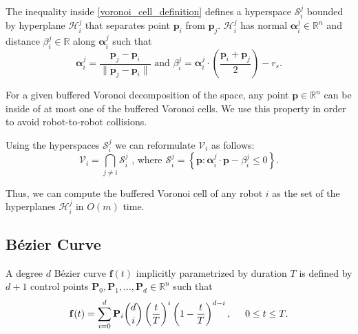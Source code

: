 \documentclass{svproc}
\newcommand{\vp}{\mathbf{p}}
\newcommand{\valpha}{\mathbf{\alpha}}
\newcommand{\vP}{\mathbf{P}}
\newcommand{\vf}{\mathbf{f}}
\newcommand{\cV}{\mathcal{V}}
\newcommand{\cS}{\mathcal{S}}
\newcommand{\cH}{\mathcal{H}}
\newcommand{\R}{\mathbb{R}} %
\begin{document}
The inequality inside \eqref{voronoi_cell_definition} defines a hyperspace $\cS_i^j$ bounded by hyperplane $\cH_i^j$ that separates point $\vp_i$ from $\vp_j$. $\cH_i^j$ has normal $\valpha_i^j \in \R^n$ and distance $\beta_i^j\in \R$ along $\valpha_i^j$ such that
\begin{equation}
    \valpha_i^j = \frac{\vp_j - \vp_i}{\|\vp_j-\vp_i\|} \text{ and }
    \beta_i^j = \valpha_i^j \cdot \left(\frac{\vp_i + \vp_j}{2}\right) - r_s.
    \label{voronoiAlphaBeta}
\end{equation}

For a given buffered Voronoi decomposition of the space, any point $\vp\in \R^n$ can be inside of at most one of the buffered Voronoi cells.
We use this property in order to avoid robot-to-robot collisions.

Using the hyperspaces $\cS_i^j$ we can reformulate $\cV_i$ as follows:
\begin{equation}
    \cV_i = \bigcap\limits_{j\neq i} \cS_i^j \text{ , where } \cS_i^j = \left\{\vp : \valpha_i^j \cdot \vp - \beta_i^j \leq 0\right\}.
    \label{voronoiEquation}
\end{equation}



Thus, we can compute the buffered Voronoi cell of any robot $i$ as the set of the hyperplanes $\cH_i^j$ in $O(m)$ time.

\subsection{B\'ezier Curve} \label{bezierCurves}
A degree $d$ B\'ezier curve $\vf(t)$ implicitly parametrized by duration $T$ is defined by $d+1$ control points $\vP_0, \vP_1, ..., \vP_d \in \R^n$ such that
\begin{align}
    \vf(t) = \sum_{i=0}^d \vP_i {d\choose i}\left(\frac{t}{T}\right)^i\left(1-\frac{t}{T}\right)^{d-i},\hskip .5cm 0\leq t \leq T.
\end{align}
\end{document}
